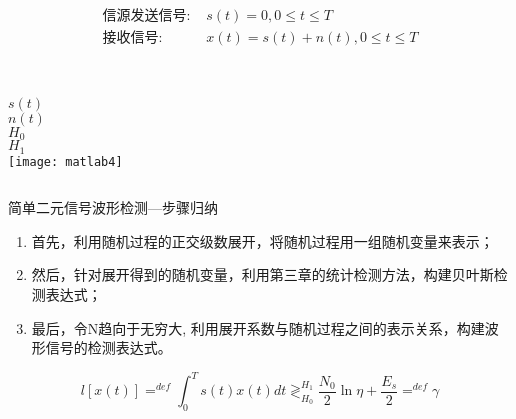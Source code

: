 \begin{frame}[shrink]
\begin{align*}
\text{信源发送信号: } &s(t)=0,0 \le t\le T\\
\text{接收信号: } &x(t)=s(t)+n(t), 0\le t\le T
\end{align*}
\begin{columns}%
	~\\
	\vspace{0.2cm}
	$s(t)$\\
	\vspace{0.5cm}
	$n(t)$\\
	\vspace{0.5cm}
	$H_0$\\
	\vspace{0.5cm}
	$H_1$\\
	\texttt{[image: matlab4]}
\end{columns}
\end{frame}
\begin{frame}{简单二元信号波形检测---步骤归纳}
\begin{enumerate}
	\setlength{\itemsep}{.5cm}
	\item 首先，利用随机过程的正交级数展开，将随机过程用一组随机变量来表示；
	\item 然后，针对展开得到的随机变量，利用第三章的统计检测方法，构建贝叶斯检测表达式；
	\item 最后，令N趋向于无穷大, 利用展开系数与随机过程之间的表示关系，构建波形信号的检测表达式。
\end{enumerate}
\[ l[x(t)]\mathop{=}^{def}\int_{0}^{T}s(t)x(t)dt\mathop{\gtrless}_{H_0}^{H_1}\frac{N_0}{2}\ln\eta+\frac{E_s}{2}\mathop{=}^{def}\gamma \]
\end{frame}

